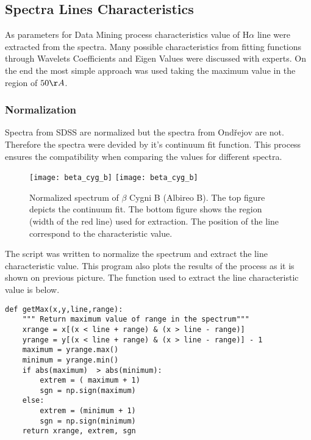 \clearpage




\subsection{Spectra Lines Characteristics}
As parameters for Data Mining process characteristics value of
H$\alpha$ line were extracted from the spectra. Many possible
characteristics from fitting functions through Wavelets Coefficients
and Eigen Values were discussed with experts. On the end the most
simple approach was used taking the maximum value in the region of
$50\AA$.



\subsubsection{Normalization}
Spectra from SDSS are normalized but the spectra from Ondřejov are
not. Therefore the spectra were devided by it's continuum fit
function. This process ensures the compatibility when comparing the
values for different spectra.


   \begin{figure}[!htbp]
      \begin{center}
        \leavevmode
        \ifpdf
        \texttt{[image: beta\_cyg\_b]}
        \else
        \texttt{[image: beta\_cyg\_b]}
        \fi
        \caption{Normalized spectrum of $\beta$ Cygni B (Albireo
          B). The top figure depicts the continuum fit. The bottom
          figure shows the region (width of the red line) used for
          extraction. The position of the line correspond to the
          characteristic value.}
        \label{FigReduction}
      \end{center}
    \end{figure}

\clearpage

The script was written to normalize the spectrum and extract the line
characteristic value. This program also plots the results of the
process as it is shown on previous picture. The function used to
extract the line characteristic value is below.


\begin{lstlisting}
def getMax(x,y,line,range):
    """ Return maximum value of range in the spectrum"""
    xrange = x[(x < line + range) & (x > line - range)]
    yrange = y[(x < line + range) & (x > line - range)] - 1
    maximum = yrange.max()
    minimum = yrange.min()
    if abs(maximum)  > abs(minimum):
        extrem = ( maximum + 1)
        sgn = np.sign(maximum)
    else:
        extrem = (minimum + 1)
        sgn = np.sign(minimum)
    return xrange, extrem, sgn
\end{lstlisting}


